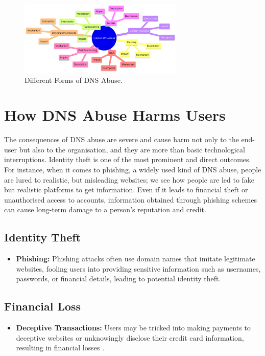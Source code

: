 \captionsetup{font= footnotesize}
\begin{figure}[H]
\centering
\includegraphics[width=0.7\textwidth]{background/dnsformstypes.png}
\caption{Different Forms of DNS Abuse.}
\label{fig:figureThree}
\end{figure}




\section{How DNS Abuse Harms Users}

The consequences of DNS abuse are severe and cause harm not only to the end-user but also to the organisation, and they are more than basic technological interruptions. Identity theft is one of the most prominent and direct outcomes. For instance, when it comes to phishing, a widely used kind of DNS abuse, people are lured to realistic, but misleading websites; we see how people are led to fake but realistic platforms to get information. Even if it leads to financial theft or unauthorised access to accounts, information obtained through phishing schemes can cause long-term damage to a person's reputation and credit\cite{godaddy2023dnsabuse}.

\subsection{Identity Theft}
\begin{itemize}
    \item \textbf{Phishing:} Phishing attacks often use domain names that imitate legitimate websites, fooling users into providing sensitive information such as usernames, passwords, or financial details, leading to potential identity theft.
\end{itemize}

\subsection{Financial Loss}
\begin{itemize}
    \item \textbf{Deceptive Transactions:} Users may be tricked into making payments to deceptive websites or unknowingly disclose their credit card information, resulting in financial losses \cite{bohme2013economics}.
\end{itemize}

